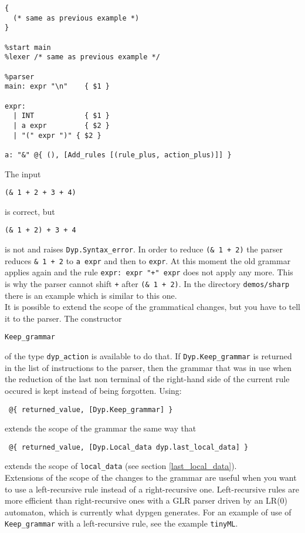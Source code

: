 \documentclass[12pt]{article}
\begin{document}
{\begin{verbatim}
{
  (* same as previous example *)
}

%start main
%lexer /* same as previous example */

%parser
main: expr "\n"    { $1 }

expr:
  | INT            { $1 }
  | a expr         { $2 }
  | "(" expr ")" { $2 }

a: "&" @{ (), [Add_rules [(rule_plus, action_plus)]] }
\end{verbatim}

The input
\begin{verbatim}
(& 1 + 2 + 3 + 4)
\end{verbatim}
is correct, but
\begin{verbatim}
(& 1 + 2) + 3 + 4
\end{verbatim}
is not and raises \verb|Dyp.Syntax_error|. In order to reduce \texttt{(\& 1 + 2)} the parser reduces \verb|& 1 + 2| to \texttt{a expr} and then to \texttt{expr}. At this moment the old grammar applies again and the rule \texttt{expr: expr "+" expr} does not apply any more. This is why the parser cannot shift \texttt{+} after \texttt{(\& 1 + 2)}. In the directory \texttt{demos/sharp} there is an example which is similar to this one.\\

It is possible to extend the scope of the grammatical changes, but you have to tell it to the parser. The constructor
\begin{verbatim}
Keep_grammar
\end{verbatim}
of the type \verb|dyp_action| is available to do that. If \verb|Dyp.Keep_grammar| is returned in the list of instructions to the parser, then the grammar that was in use when the reduction of the last non terminal of the right-hand side of the current rule occured is kept instead of being forgotten. Using:
\begin{verbatim}
 @{ returned_value, [Dyp.Keep_grammar] }
\end{verbatim}
extends the scope of the grammar the same way that
\begin{verbatim}
 @{ returned_value, [Dyp.Local_data dyp.last_local_data] }
\end{verbatim}
extends the scope of \verb|local_data| (see section \ref{last_local_data}).\\

Extensions of the scope of the changes to the grammar are useful when you want to use a left-recursive rule instead of a right-recursive one. Left-recursive rules are more efficient than right-recursive ones with a GLR parser driven by an LR(0) automaton, which is currently what dypgen generates. For an example of use of \verb|Keep_grammar| with a left-recursive rule, see the example \verb|tinyML|.\\

}
\end{document}
